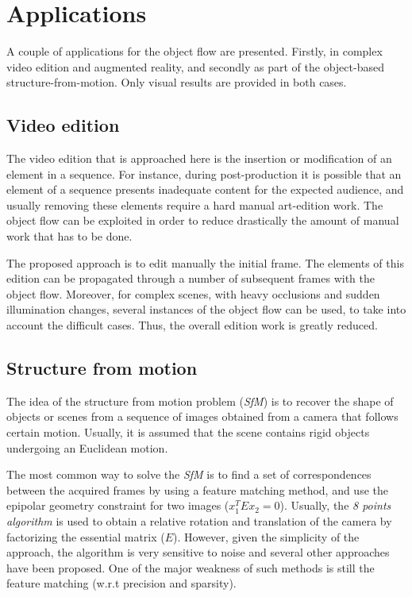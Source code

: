 \chapter{Applications} \label{chap:apps}

A couple of applications for the object flow are presented. Firstly, 
in complex video edition and augmented reality, and secondly as part 
of the object-based structure-from-motion. Only visual results are provided 
in both cases.

\section{Video edition}

The video edition that is approached here is the insertion or modification of 
an element in a sequence. For instance, during post-production it is possible that 
an element of a sequence presents inadequate content for the expected audience, and usually 
removing these elements require a hard manual art-edition work. The object flow 
can be exploited in order to reduce drastically the amount of manual work that has to be done. 

The proposed approach is to edit manually the initial frame. The elements of this edition 
can be propagated  through a number of subsequent frames with the object flow. Moreover, 
for complex scenes, with heavy occlusions and sudden illumination changes, several instances 
of the object flow can be used, to take into account the difficult cases. Thus, the overall edition 
work is greatly reduced.



\section{Structure from motion}

The idea of the structure from motion problem ({\it SfM}) is to 
recover the shape of objects or scenes from a sequence of images obtained from a camera that follows certain motion. Usually, it is assumed that 
the scene contains rigid objects undergoing an 
Euclidean motion.

The most common way to solve the {\it SfM} is to 
find a set of correspondences between the acquired 
frames by using a feature matching method, and use the epipolar geometry constraint for two images 
($x_1^T E x_2 = 0$). Usually, the {\it 8 points algorithm} is used to obtain a relative rotation 
and translation of the camera by factorizing the 
essential matrix ($E$). However, given the simplicity of the approach, the algorithm is very sensitive to noise and several other approaches have 
been proposed. One of the major weakness of such 
methods is still the feature matching (w.r.t precision and sparsity). 


